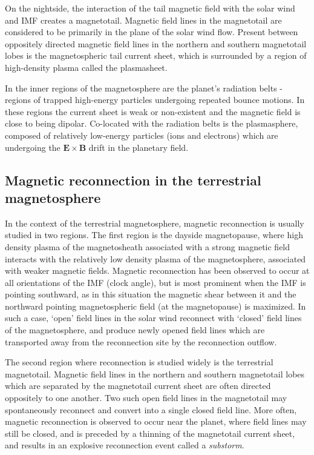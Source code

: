 On the nightside, the interaction of the tail magnetic field with the solar wind and IMF creates a magnetotail. Magnetic field lines in the magnetotail are considered to be primarily in the plane of the solar wind flow. Present between oppositely directed magnetic field lines in the northern and southern magnetotail lobes is the magnetospheric tail current sheet, which is surrounded by a region of high-density plasma called the plasmasheet. 

In the inner regions of the magnetosphere are the planet's radiation belts - regions of trapped high-energy particles undergoing repeated bounce motions. In these regions the current sheet is weak or non-existent and the magnetic field is close to being dipolar. Co-located with the radiation belts is the plasmasphere, composed of relatively low-energy particles (ions and electrons) which are undergoing the $\mathbf{E}\times\mathbf{B}$ drift in the planetary field.

\subsection{Magnetic reconnection in the terrestrial magnetosphere}
In the context of the terrestrial magnetosphere, magnetic reconnection is usually studied in two regions. The first region is the dayside magnetopause, where high density plasma of the magnetosheath associated with a strong magnetic field interacts with the relatively low density plasma of the magnetosphere, associated with weaker magnetic fields. Magnetic reconnection has been observed to occur at all orientations of the IMF (clock angle), but is most prominent when the IMF is pointing southward, as in this situation the magnetic shear between it and the northward pointing magnetospheric field (at the magnetopause) is maximized. In such a case, `open' field lines in the solar wind reconnect with `closed' field lines of the magnetosphere, and produce newly opened field lines which are transported away from the reconnection site by the reconnection outflow.

The second region where reconnection is studied widely is the terrestrial magnetotail. Magnetic field lines in the northern and southern magnetotail lobes which are separated by the magnetotail current sheet are often directed oppositely to one another. Two such open field lines in the magnetotail may spontaneously reconnect and convert into a single closed field line. More often, magnetic reconnection is observed to occur near the planet, where field lines may still be closed, and is preceded by a thinning of the magnetotail current sheet, and results in an explosive reconnection event called a \emph{substorm}. 

